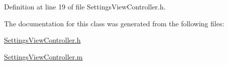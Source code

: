 Definition at line 19 of file SettingsViewController.h.



The documentation for this class was generated from the following files:\begin{DoxyCompactItemize}
\item 
\hyperlink{_settings_view_controller_8h}{SettingsViewController.h}\item 
\hyperlink{_settings_view_controller_8m}{SettingsViewController.m}\end{DoxyCompactItemize}
